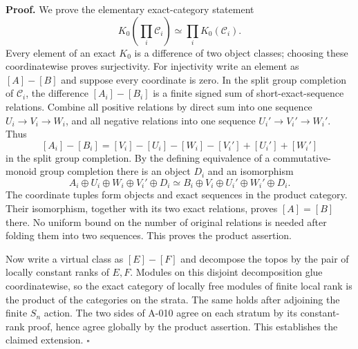 \textbf{Proof.} We prove the elementary exact-category statement
\[
 K_0\left(\prod_i\mathcal C_i\right)\simeq\prod_iK_0(\mathcal C_i).
\]
Every element of an exact $K_0$ is a difference of two object classes;
choosing these coordinatewise proves surjectivity. For injectivity
write an element as $[A]-[B]$ and suppose every coordinate is zero.
In the split group completion of $\mathcal C_i$, the difference
$[A_i]-[B_i]$ is a finite signed sum of short-exact-sequence
relations. Combine all positive relations by direct sum into
one sequence $U_i\to V_i\to W_i$, and all negative relations into
one sequence $U_i'\to V_i'\to W_i'$. Thus
\[
 [A_i]-[B_i]=[V_i]-[U_i]-[W_i]-[V_i']+[U_i']+[W_i']
\]
in the split group completion. By the defining equivalence of a
commutative-monoid group completion there is an object $D_i$ and
an isomorphism
\[
 A_i\oplus U_i\oplus W_i\oplus V_i'\oplus D_i
 \simeq B_i\oplus V_i\oplus U_i'\oplus W_i'\oplus D_i.
\]
The coordinate tuples form objects and exact sequences in the
product category. Their isomorphism, together with its two exact
relations, proves $[A]=[B]$ there. No uniform bound on the number
of original relations is needed after folding them into two
sequences. This proves the product assertion.

Now write a virtual class as $[E]-[F]$ and decompose the topos by
the pair of locally constant ranks of $E,F$. Modules on this
disjoint decomposition glue coordinatewise, so the exact category
of locally free modules of finite local rank is the product of
the categories on the strata. The same holds after adjoining the
finite $S_n$ action. The two sides of A-010 agree on each stratum
by its constant-rank proof, hence agree globally by the product
assertion. This establishes the claimed extension. \hfill$\square$

